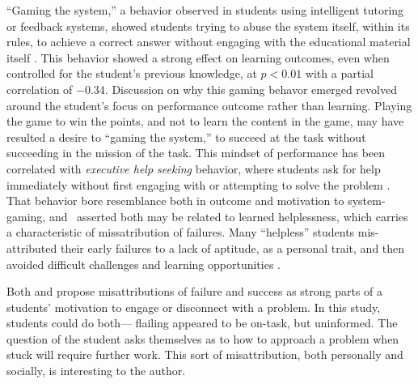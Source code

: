 ``Gaming the system,'' a behavior observed in students using intelligent tutoring or feedback systems, showed students trying to abuse the system itself, within its rules, to achieve a correct answer without engaging with the educational material itself \citep{baker2004off}. This behavior showed a strong effect on learning outcomes, even when controlled for the student's previous knowledge, at $p<0.01$ with a partial correlation of $-0.34$. Discussion on why this gaming behavor emerged revolved around the student's focus on performance outcome rather than learning. Playing the game to win the points, and not to learn the content in the game, may have resulted a desire to ``gaming the system,'' to succeed at the task without succeeding in the mission of the task. This mindset of performance has been correlated with \emph{executive help seeking} behavior, where students ask for help immediately without first engaging with or attempting to solve the problem \citep{arbreton1998student}. That behavior bore resemblance both in outcome and motivation to system-gaming, and \citeauthor{baker2004off}~asserted both may be related to learned helplessness, which carries a characteristic of missatribution of failures. Many ``helpless'' students mis-attributed their early failures to a lack of aptitude, as a personal trait, and then avoided difficult challenges and learning opportunities \citep{dweck1988social}. 

Both \citeauthor{wilson-2002} and \citeauthor{baker2004off} propose misattributions of failure and success as strong parts of a students' motivation to engage or disconnect with a problem. In this study, students could do both--- flailing appeared to be on-task, but uninformed. The question of the student asks themselves as to how to approach a problem when stuck will require further work. This sort of misattribution, both personally and socially, is interesting to the author.


